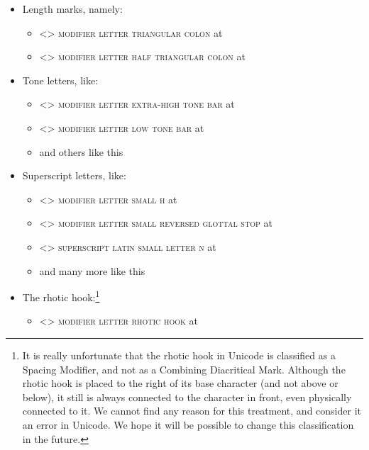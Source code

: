\begin{itemize}
  
	\item[] Length marks, namely: 
	\begin{itemize}
	  \item[] <> \textsc{modifier letter triangular colon} at 
	  \item[] <> \textsc{modifier letter half triangular colon} at 
	\end{itemize}
	 
	\item[] Tone letters, like: 
	\begin{itemize} 
	  \item[] <> \textsc{modifier letter extra-high tone bar} at 
	  \item[] <> \textsc{modifier letter low tone bar} at 
	  \item[] and others like this
	\end{itemize}
	
	\item[] Superscript letters, like:
	\begin{itemize}
	  \item[] <> \textsc{modifier letter small h} at 
	  \item[] <> \textsc{modifier letter small reversed glottal stop} at 
	  \item[] <> \textsc{superscript latin small letter n} at 
	  \item[] and many more like this
	\end{itemize}
	
	\item[] The rhotic hook:\footnote{It is really unfortunate that the rhotic hook
         in Unicode is classified as a Spacing Modifier, and not as a Combining 
         Diacritical Mark. Although the rhotic hook is placed to the right of its 
         base character (and not above or below), it still is always connected 
         to the character in front, even physically connected to it. We cannot 
         find any reason for this treatment, and consider it an error in 
         Unicode. We hope it will be possible to change this classification in 
         the future.}
	\begin{itemize}
	  \item[] <> \textsc{modifier letter rhotic hook} at 
	\end{itemize}
	
\end{itemize}

